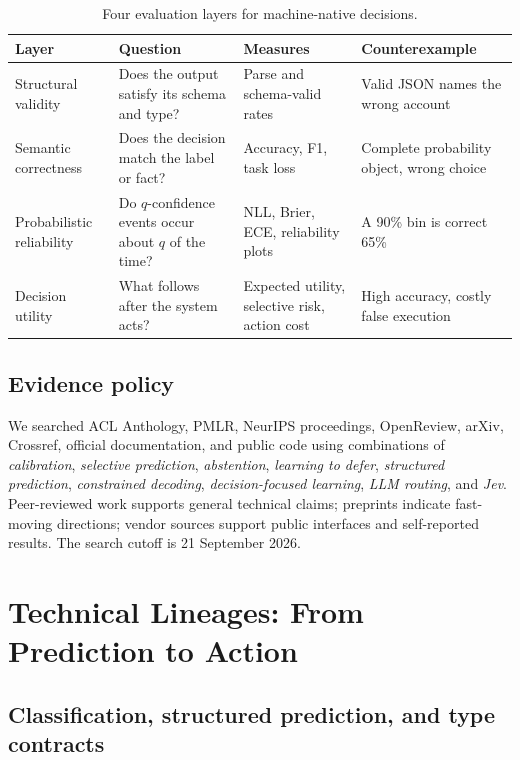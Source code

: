 \documentclass[11pt]{article}
\begin{document}
\begin{table}[t]
\centering\small
\begin{tabular}{p{.19\linewidth}p{.28\linewidth}p{.23\linewidth}p{.21\linewidth}}
\toprule
Layer & Question & Measures & Counterexample \\
\midrule
Structural validity & Does the output satisfy its schema and type? & Parse and schema-valid rates & Valid JSON names the wrong account \\
Semantic correctness & Does the decision match the label or fact? & Accuracy, F1, task loss & Complete probability object, wrong choice \\
Probabilistic reliability & Do $q$-confidence events occur about $q$ of the time? & NLL, Brier, ECE, reliability plots & A 90\% bin is correct 65\% \\
Decision utility & What follows after the system acts? & Expected utility, selective risk, action cost & High accuracy, costly false execution \\
\bottomrule
\end{tabular}
\caption{Four evaluation layers for machine-native decisions.}
\label{tab:layers}
\end{table}

\subsection{Evidence policy}

We searched ACL Anthology, PMLR, NeurIPS proceedings, OpenReview, arXiv, Crossref, official documentation, and public code using combinations of \emph{calibration}, \emph{selective prediction}, \emph{abstention}, \emph{learning to defer}, \emph{structured prediction}, \emph{constrained decoding}, \emph{decision-focused learning}, \emph{LLM routing}, and \emph{Jev}. Peer-reviewed work supports general technical claims; preprints indicate fast-moving directions; vendor sources support public interfaces and self-reported results. The search cutoff is 21 September 2026.

\section{Technical Lineages: From Prediction to Action}

\subsection{Classification, structured prediction, and type contracts}
\end{document}
